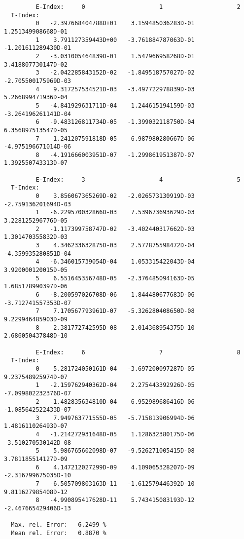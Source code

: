 \documentclass[12pt,dvipdfmx]{article}
\begin{document}
\begin{small}\begin{verbatim}
         E-Index:     0                     1                     2
  T-Index:
         0   -2.397668404788D+01    3.159485036283D-01    1.251349908668D-01
         1    3.791127359443D+00   -3.761884787063D-01   -1.201611289430D-01
         2   -3.031005464839D-01    1.547966958268D-01    3.418807730147D-02
         3   -2.042285843152D-02   -1.849518757027D-02   -2.705500175969D-03
         4    9.317257534521D-03   -3.497722978839D-03    5.266899471936D-04
         5   -4.841929631711D-04    1.244615194159D-03   -3.264196261141D-04
         6   -9.483126811734D-05   -1.399032118750D-04    6.356897513547D-05
         7    1.241207591818D-05    6.987980280667D-06   -4.975196671014D-06
         8   -4.191666003951D-07   -1.299861951387D-07    1.392550743313D-07

         E-Index:     3                     4                     5
  T-Index:
         0    3.856067365269D-02   -2.026573130919D-03   -2.759136201694D-03
         1   -6.229570032866D-03    7.539673693629D-03    3.228125296776D-05
         2   -1.117399758747D-02   -3.402440317662D-03    1.301470355832D-03
         3    4.346233632875D-03    2.577875598472D-04   -4.359935280851D-04
         4   -6.346015739054D-04    1.053315422043D-04    3.920000120015D-05
         5    6.551645356748D-05   -2.376485094163D-05    1.685178990397D-06
         6   -8.200597026708D-06    1.844480677683D-06   -3.712741557353D-07
         7    7.170567793961D-07   -5.326280408650D-08    9.229946485903D-09
         8   -2.381772742595D-08    2.014368954375D-10    2.686050437848D-10

         E-Index:     6                     7                     8
  T-Index:
         0    5.281724050161D-04   -3.697200097287D-05    9.237548925974D-07
         1   -2.159762940362D-04    2.275443392926D-05   -7.099802232376D-07
         2   -1.482835634810D-04    6.952989686416D-06   -1.085642522433D-07
         3    7.949763771555D-05   -5.715813906994D-06    1.481611026493D-07
         4   -1.214272931648D-05    1.128632380175D-06   -3.510270530142D-08
         5    5.986765602098D-07   -9.526271005415D-08    3.781185514127D-09
         6    4.147212027299D-09    4.109065328207D-09   -2.316799675035D-10
         7   -6.505709803163D-11   -1.612579446392D-10    9.811627985408D-12
         8   -4.990895417628D-11    5.743415083193D-12   -2.467665429406D-13

  Max. rel. Error:   6.2499 %
  Mean rel. Error:   0.8870 %


\end{verbatim}\end{small}
\end{document}
